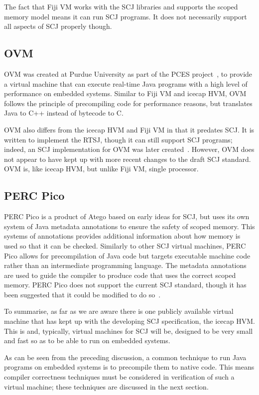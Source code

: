 \documentclass[a4paper,10pt]{report}
\begin{document}
The fact that Fiji VM works with the SCJ libraries and supports the
scoped memory model means it can run SCJ programs.
It does not necessarily support all aspects of SCJ properly though.

\subsection{OVM}

OVM was created at Purdue University as part of the PCES
project~\cite{baker2006}, to provide a virtual machine that can
execute real-time Java programs with a high level of performance on
embedded systems.
Similar to Fiji VM and icecap HVM, OVM follows the principle of
precompiling code for performance reasons, but translates Java to C++
instead of bytecode to C.

OVM also differs from the icecap HVM and Fiji VM in that it predates
SCJ.
It is written to implement the RTSJ, though it can still support SCJ
programs; indeed, an SCJ implementation for OVM was later
created~\cite{plsek2010}.
However, OVM does not appear to have kept up with more recent changes
to the draft SCJ standard.
OVM is, like icecap HVM, but unlike Fiji VM, single processor.

\subsection{PERC Pico}

PERC Pico is a product of Atego based on early ideas for SCJ, but uses
its own system of Java metadata annotations to ensure the safety of
scoped memory.
This systems of annotations provides additional information about how
memory is used so that it can be checked.
Similarly to other SCJ virtual machines, PERC Pico allows for
precompilation of Java code but targets executable machine code rather
than an intermediate programming language.
The metadata annotations are used to guide the compiler to produce
code that uses the correct scoped memory.
PERC Pico does not support the current SCJ standard, though it has
been suggested that it could be modified to do so~\cite{nilsen2011}.

To summarise, as far as we are aware there is one publicly available
virtual machine that has kept up with the developing SCJ
specification, the icecap HVM.
This is and, typically, virtual machines for SCJ will be, designed to
be very small and fast so as to be able to run on embedded systems.

As can be seen from the preceding discussion, a common technique to
run Java programs on embedded systems is to precompile them to native
code.
This means compiler correctness techniques must be considered in
verification of such a virtual machine; these techniques are discussed
in the next section.
\end{document}
